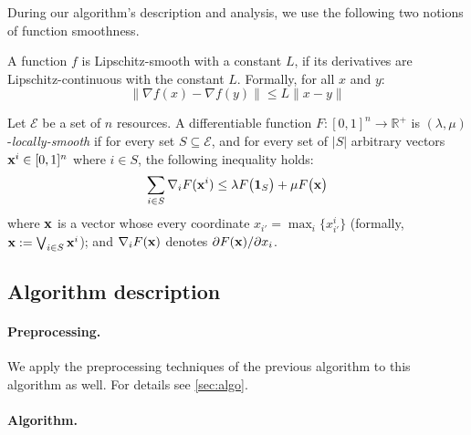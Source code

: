 During our algorithm's description and analysis, we use the following two notions of function smoothness.

\begin{definition}
    A function $f$ is Lipschitz-smooth with a constant $L$, if its derivatives are Lipschitz-continuous with the constant $L$. Formally, for all $x$ and $y$:
    \[\|\nabla f(x) - \nabla f(y)\| \le L \|x - y\|\]
\end{definition}

\begin{definition}
    Let $\mathcal{E}$ be a set of $n$ resources.
    A differentiable function $F: [0,1]^{n} \rightarrow \mathbb{R}^{+}$ is $(\lambda,\mu)$-\emph{locally-smooth}
    if for every set $S \subseteq \mathcal{E}$, and for every set of $|S|$ arbitrary vectors $\mathbf{x}^{i} \in [0,1]^{n}$ where $i \in S$, the following inequality holds:
    \begin{equation*}	\label{eq:min-local-smooth}
    \sum_{i \in S} \nabla_{i} F(\mathbf{x}^{i}) \leq \lambda F\bigl( \mathbf{1}_{S} \bigr) + \mu F\bigl( \mathbf{x} \bigr)
    \end{equation*}
    where $\mathbf{x}$ is a vector whose every coordinate $x_{i'} = \max_{i}\{x^{i}_{i'}\}$ (formally, $\mathbf{x} := \bigvee_{i \in S} \mathbf{x}^{i}$);
    and $\nabla_{i} F(\mathbf{x})$ denotes $\partial F(\mathbf{x})/\partial x_{i}$.
\end{definition}

\subsection{Algorithm description}

\paragraph{Preprocessing.} We apply the preprocessing techniques of the previous algorithm to this algorithm as well. For details see \cref{sec:algo}.

\paragraph{Algorithm.}

